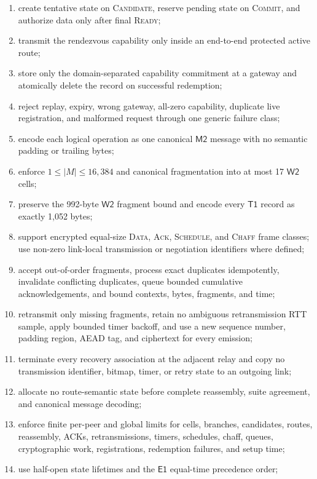 \documentclass[11pt,oneside]{article}
\newcommand{\Eone}{\ensuremath{\mathsf{E1}}}
\newcommand{\Mtwo}{\ensuremath{\mathsf{M2}}}
\newcommand{\Wtwo}{\ensuremath{\mathsf{W2}}}
\newcommand{\Tone}{\ensuremath{\mathsf{T1}}}
\begin{document}
\begin{enumerate}
  \item create tentative state on \textsc{Candidate}, reserve pending state on \textsc{Commit}, and authorize data only after final \textsc{Ready};
  \item transmit the rendezvous capability only inside an end-to-end protected active route;
  \item store only the domain-separated capability commitment at a gateway and atomically delete the record on successful redemption;
  \item reject replay, expiry, wrong gateway, all-zero capability, duplicate live registration, and malformed request through one generic failure class;
  \item encode each logical operation as one canonical \Mtwo{} message with no semantic padding or trailing bytes;
  \item enforce $1\le|M|\le16{,}384$ and canonical fragmentation into at most 17 \Wtwo{} cells;
  \item preserve the 992-byte \Wtwo{} fragment bound and encode every \Tone{} record as exactly 1,052 bytes;
  \item support encrypted equal-size \textsc{Data}, \textsc{Ack}, \textsc{Schedule}, and \textsc{Chaff} frame classes; use non-zero link-local transmission or negotiation identifiers where defined;
  \item accept out-of-order fragments, process exact duplicates idempotently, invalidate conflicting duplicates, queue bounded cumulative acknowledgements, and bound contexts, bytes, fragments, and time;
  \item retransmit only missing fragments, retain no ambiguous retransmission RTT sample, apply bounded timer backoff, and use a new sequence number, padding region, AEAD tag, and ciphertext for every emission;
  \item terminate every recovery association at the adjacent relay and copy no transmission identifier, bitmap, timer, or retry state to an outgoing link;
  \item allocate no route-semantic state before complete reassembly, suite agreement, and canonical message decoding;
  \item enforce finite per-peer and global limits for cells, branches, candidates, routes, reassembly, ACKs, retransmissions, timers, schedules, chaff, queues, cryptographic work, registrations, redemption failures, and setup time;
  \item use half-open state lifetimes and the \Eone{} equal-time precedence order;

\end{enumerate}
\end{document}
